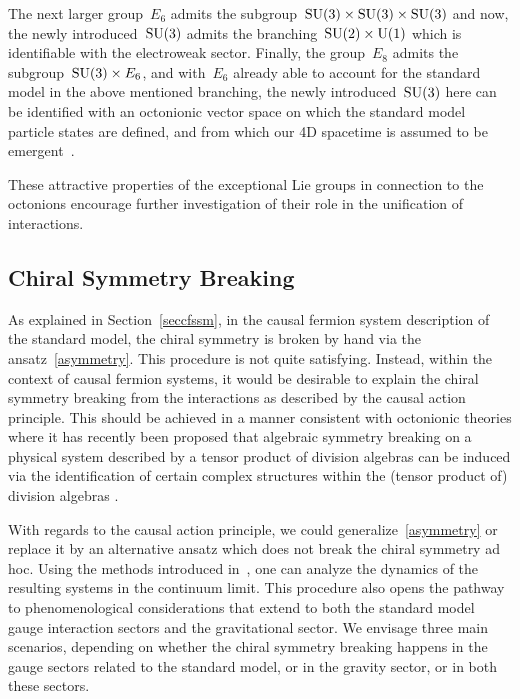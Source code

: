 \documentclass[reqno,11pt]{amsart}
\numberwithin{equation}{section}
\newcommand{\1}{\mbox{\rm 1 \hspace{-1.05 em} 1}}
\newcommand{\U}{{\rm{U}}}
\newcommand{\SU}{{\rm{SU}}}
\begin{document}
 The next larger group~$E_6$ admits the subgroup~$\SU(3)\times \SU(3) \times \SU(3)$ and now, the newly introduced~$\SU(3)$ admits the branching~$\SU(2) \times \U(1)$ which is identifiable with the electroweak sector. Finally, the group~$E_8$ admits the subgroup~$\SU(3) \times E_6$, and with~$E_6$ already able to account for the standard model in the above mentioned branching, the newly introduced~$\SU(3)$ here can be identified with an octonionic vector space on which the standard model particle states are defined, and from which our 4D spacetime is assumed to be emergent~\cite{Kaushik, singh-octo4}.
 
These attractive properties of the exceptional Lie groups in connection to the octonions encourage further investigation of their role in the unification of interactions.  

\subsection{Chiral Symmetry Breaking} \label{secchiralsymm}
As explained in Section~\ref{seccfssm}, in the causal fermion system
description of the standard model, the chiral symmetry is broken by hand via the ansatz~\eqref{asymmetry}.
This procedure is not quite satisfying. Instead, within the context of causal fermion systems, it would be desirable to explain the chiral symmetry breaking
from the interactions as described by the causal action principle. This should be achieved in a manner consistent with octonionic theories where it has recently been proposed that algebraic symmetry breaking on a physical system described by a tensor product of division algebras can be induced via the identification of certain complex structures within the (tensor product of) division algebras \cite{furey231}.

With regards to the causal action principle, we could generalize~\eqref{asymmetry} or replace it by an alternative ansatz which does
not break the chiral symmetry ad hoc. Using the methods introduced in~\cite{cfs}, one can analyze
the dynamics of the resulting systems in the continuum limit.
This procedure also opens the pathway to phenomenological considerations that extend to both the standard model gauge interaction sectors and the gravitational sector. We envisage three main scenarios, depending on whether the chiral symmetry breaking happens in the gauge sectors related to the standard model, or in the gravity sector, or in both these sectors.
\end{document}
